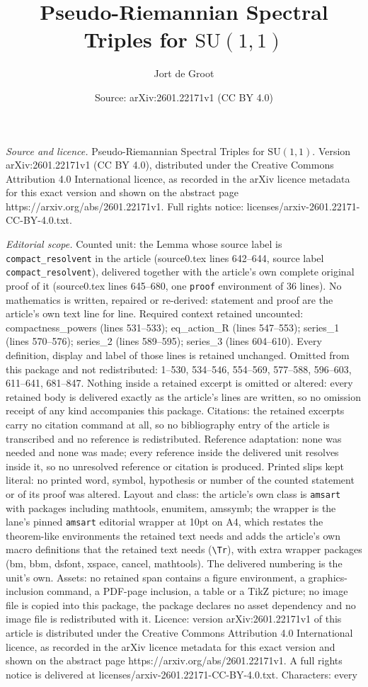 \documentclass[10pt,a4paper]{amsart}
\title[Pseudo-Riemannian Spectral Triples for $\mathrm{SU}(1,1)$]{Pseudo-Riemannian Spectral Triples for $\mathrm{SU}(1,1)$}
\author{Jort de Groot}
\date{Source: arXiv:2601.22171v1 (CC BY 4.0)}
\begin{document}
\maketitle

\noindent\emph{Source and licence.} Pseudo-Riemannian Spectral Triples for $\mathrm{SU}(1,1)$. Version arXiv:2601.22171v1 (CC BY 4.0), distributed under the Creative Commons Attribution 4.0 International licence, as recorded in the arXiv licence metadata for this exact version and shown on the abstract page https://arxiv.org/abs/2601.22171v1. Full rights notice: licenses/arxiv-2601.22171-CC-BY-4.0.txt.\par\smallskip

\noindent\textit{Editorial scope.} Counted unit: the Lemma whose source label is \texttt{compact\_resolvent} in the article (source0.tex lines 642--644, source label \texttt{compact\_resolvent}), delivered together with the article's own complete original proof of it (source0.tex lines 645--680, one \texttt{proof} environment of 36 lines). No mathematics is written, repaired or re-derived: statement and proof are the article's own text line for line. Required context retained uncounted: compactness\_powers (lines 531--533); eq\_action\_R (lines 547--553); series\_1 (lines 570--576); series\_2 (lines 589--595); series\_3 (lines 604--610). Every definition, display and label of those lines is retained unchanged. Omitted from this package and not redistributed: 1--530, 534--546, 554--569, 577--588, 596--603, 611--641, 681--847. Nothing inside a retained excerpt is omitted or altered: every retained body is delivered exactly as the article's lines are written, so no omission receipt of any kind accompanies this package. Citations: the retained excerpts carry no citation command at all, so no bibliography entry of the article is transcribed and no reference is redistributed. Reference adaptation: none was needed and none was made; every reference inside the delivered unit resolves inside it, so no unresolved reference or citation is produced. Printed slips kept literal: no printed word, symbol, hypothesis or number of the counted statement or of its proof was altered. Layout and class: the article's own class is \texttt{amsart} with packages including mathtools, enumitem, amssymb; the wrapper is the lane's pinned \texttt{amsart} editorial wrapper at 10pt on A4, which restates the theorem-like environments the retained text needs and adds the article's own macro definitions that the retained text needs (\texttt{\textbackslash Tr}), with extra wrapper packages (bm, bbm, dsfont, xspace, cancel, mathtools). The delivered numbering is the unit's own. Assets: no retained span contains a figure environment, a graphics-inclusion command, a PDF-page inclusion, a table or a TikZ picture; no image file is copied into this package, the package declares no asset dependency and no image file is redistributed with it. Licence: version arXiv:2601.22171v1 of this article is distributed under the Creative Commons Attribution 4.0 International licence, as recorded in the arXiv licence metadata for this exact version and shown on the abstract page https://arxiv.org/abs/2601.22171v1. A full rights notice is delivered at licenses/arxiv-2601.22171-CC-BY-4.0.txt. Characters: every 
\end{document}
